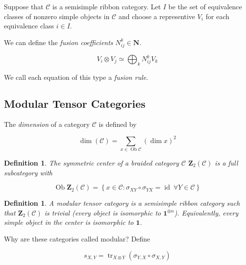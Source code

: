 \documentclass[]{article}
\newtheorem{defn}[theorem]{Definition}
\newcommand{\tr}{\operatorname{tr}}
\newcommand{\id}{\operatorname{id}}
\newcommand{\Ob}{\operatorname{Ob}}
\numberwithin{equation}{subsection}
\begin{document}
    Suppose that $\mathcal{C}$ is a semisimple ribbon category. Let $I$ be the
    set of equivalence classes of nonzero simple objects in $\mathcal{C}$ and
    choose a representive $V_i$ for each equivalence class  $i \in I$.
    
    We can define the \emph{fusion coefficients} $N_{ij}^k \in \mathbf{N}$.

    \begin{equation}
        V_i \otimes V_j \simeq \bigoplus_k N_{ij}^k V_k
    \end{equation}

    We call each equation of this type a \emph{fusion rule}. 

    \subsection{Modular Tensor Categories}

The \emph{dimension} of a category $\mathcal{C}$ is defined by 

\begin{equation}
    \operatorname{dim}(\mathcal{C}) = \sum_{ x \in \Ob \mathcal{C}} (\operatorname{dim} x)^2
\end{equation}


\begin{defn}
    The \emph{symmetric center} of a braided category $\mathcal{C}$ $\mathbf{Z}_2(\mathcal{C})$ is a full subcategory with 

    \begin{equation}
        \Ob \mathbf{Z}_2(\mathcal{C}) = \left\{ x \in \mathcal{C} : \sigma_{XY} \circ \sigma_{YX} = \id\ \forall Y \in \mathcal{C} \right\}
    \end{equation}
\end{defn}

\begin{defn}
    A modular tensor category is a semisimple ribbon category such that
    $\mathbf{Z}_2(\mathcal{C})$ is trivial (every object is isomorphic to
    $\mathbf{1}^{\oplus n}$). Equivalently, every simple object in the center
    is isomorphic to $\mathbf{1}$.  
\end{defn}

Why are these categories called modular? 
Define 

\begin{equation}
    s_{X,Y} = \tr_{X \otimes Y}(\sigma_{Y,X} \circ \sigma_{X,Y})
\end{equation}
\end{document}
